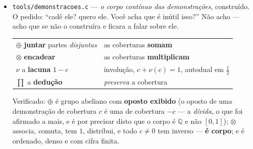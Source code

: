 \documentclass[11pt]{article}
\newcommand{\code}[1]{\texttt{\small #1}}
\newcommand{\Z}{\mathbb Z}
\newcommand{\R}{\mathbb R}
\newcommand{\Q}{\mathbb Q}
\theoremstyle{plain}
\theoremstyle{remark}
\begin{document}
\begin{itemize}
\textbf{A bijeção:} em $[0,1]$ os pontos $0$ e $1$ são o \emph{mesmo ângulo} --- a volta fechou, e
o fechado dá dois nomes a um ponto. Em $[0,1[$ cada ângulo tem um nome só: é o domínio fundamental
do círculo, e é a base do rei, com a volta inteira por unidade. \emph{É o mesmo defeito de $(2,1)$
e $(4,2)$ que se já vira hoje e não liguei.}

\textbf{E o inverso volta:} com a soma módulo $1$, $x + (1-x) \equiv 0$ para \emph{todo} $x$ ---
medido em todos os ângulos racionais do intervalo. \emph{E era exatamente esta a objeção que se
levantara contra $[0,1]$}: ``falta o inverso aditivo, logo não é corpo''. A objeção some ao trocar
o intervalo --- e o intervalo fechado era escolha \textbf{anterior}, outra vez.

\emph{O que fica dito com clareza, que era o que ele pedia:} $[0,1]$ com aquelas operações
\textbf{não} é corpo --- falta o inverso aditivo, e isso é facto sobre $[0,1]$; o elíptico
\textbf{ordena} --- pela elongação, medido, e o ``não ordena'' era sobre $\Z[i]$, representação
anterior; e $[0,1[$ \textbf{é} mais adequado --- pelas duas razões. \emph{O que ele não faz:} sozinho
não dá corpo --- é \textbf{grupo} ($\R/\Z$), com uma operação. Para corpo faltaria o $\otimes$
fechado e compatível, e esse não o tenho --- e não o invento.
\item \code{tools/demonstracoes.c} --- \emph{o corpo contínuo das demonstrações}, construído.
O pedido: ``cadê ele? quero ele. Você acha que é inútil isso?'' Não acho --- acho que se não o
construíra e ficara a falar sobre ele.

\begin{center}\begin{tabular}{ll}
$\oplus$ \textbf{juntar} partes \emph{disjuntas} & as coberturas \textbf{somam} \\
$\otimes$ \textbf{encadear} & as coberturas \textbf{multiplicam} \\
$\nu$ a \textbf{lacuna} $1-c$ & involução, $c + \nu(c) = 1$, autodual em $\tfrac12$ \\
$\prod$ a \textbf{dedução} & \emph{preserva} a cobertura \\
\end{tabular}\end{center}

Verificado: $\oplus$ é grupo abeliano com \textbf{oposto exibido} (o oposto de uma demonstração
de cobertura $c$ é uma de cobertura $-c$ --- a \emph{dívida}, o que foi afirmado a mais, e é por
precisar disto que o corpo é $\Q$ e não $[0,1]$); $\otimes$ associa, comuta, tem $1$, distribui, e
todo $c \neq 0$ tem inverso --- \textbf{é corpo}; e é ordenado, denso e com cifra finita.


\end{itemize}
\end{document}
